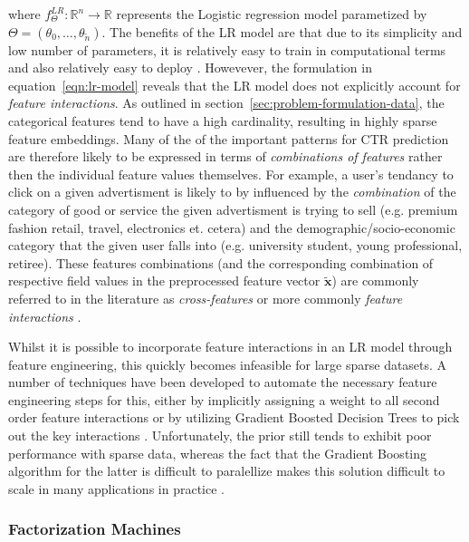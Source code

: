 \documentclass{mldsmsc}
\begin{document}
where $f_{\Theta}^{LR}: \mathbb{R}^n \rightarrow \mathbb{R}$ represents the Logistic regression
model parametized by $\Theta = (\theta_0, \ldots, \theta_{\tilde{n}})$. The benefits of the LR
model are that due to its simplicity and low number of parameters, it is relatively easy to
train in computational terms and also relatively easy to deploy \citep{RefWorks:zhang2021deep}.
Howevever, the formulation in equation~\ref{eqn:lr-model} reveals that the LR model does not explicitly 
account for \emph{feature interactions}.
As outlined in section~\ref{sec:problem-formulation-data}, the categorical features tend to have a
high cardinality, resulting in highly sparse feature embeddings. Many of the of the important patterns
for CTR prediction are therefore likely to be expressed in terms of \emph{combinations of features}
rather then the individual feature values themselves. For example, a user's tendancy to
click on a given advertisment is likely to by influenced by the \emph{combination} of the category
of good or service the given advertisment is trying to sell (e.g. premium fashion retail, travel, electronics et. cetera)
and the demographic/socio-economic category that the given user falls into (e.g. university student, young professional, retiree).
These features combinations (and the corresponding combination of respective field values 
in the preprocessed feature vector $\tilde{\mathbf{x}}$) are commonly referred to in
the literature as \emph{cross-features} \citep{RefWorks:zhang2023memonet:} or more commonly
\emph{feature interactions} \citep{RefWorks:cheng2016wide,RefWorks:xiao2017attentional,RefWorks:song2019autoint}.

Whilst it is possible to incorporate feature interactions in an LR model through feature
engineering, this quickly becomes infeasible for large sparse datasets. A number of techniques
have been developed to automate the necessary feature engineering steps for this, either by
implicitly assigning a weight to all second order feature interactions \citep{RefWorks:chang2010training}
or by utilizing Gradient Boosted Decision Trees to pick out the key interactions \citep{RefWorks:cheng2014gradient}.
Unfortunately, the prior still tends to exhibit poor performance with sparse data, 
whereas the fact that the Gradient Boosting algorithm for the latter is difficult to paralellize
makes this solution difficult to scale in many applications in practice \citep{RefWorks:zhang2021deep}.

\subsubsection{Factorization Machines}
\end{document}
